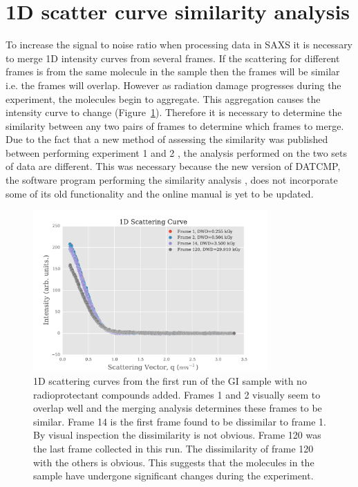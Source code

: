 \section{1D scatter curve similarity analysis}
\label{sec:1D scatter curve similarity analysis}
To increase the signal to noise ratio when processing data in SAXS it is necessary to merge 1D intensity curves from several frames.
If the scattering for different frames is from the same molecule in the sample then the frames will be similar i.e. the frames will overlap.
However as radiation damage progresses during the experiment, the molecules begin to aggregate.
This aggregation causes the intensity curve to change (Figure~\ref{fig:1D Scatter Curves}).
Therefore it is necessary to determine the similarity between any two pairs of frames to determine which frames to merge.
Due to the fact that a new method of assessing the similarity was published between performing experiment 1 and 2 \cite{franke2015correlation}, the analysis performed on the two sets of data are different.
This was necessary because the new version of DATCMP, the software program performing the similarity analysis \cite{petoukhov2012new}, does not incorporate some of its old functionality and the online manual is yet to be updated.
\begin{figure}
    \centering
    \includegraphics[width=0.8\textwidth]{figures/saxs/scatter_curves.pdf}
    \caption{1D scattering curves from the first run of the GI sample with no radioprotectant compounds added. Frames 1 and 2 visually seem to overlap well and the merging analysis determines these frames to be similar. Frame 14 is the first frame found to be dissimilar to frame 1. By visual inspection the dissimilarity is not obvious. Frame 120 was the last frame collected in this run. The dissimilarity of frame 120 with the others is obvious. This suggests that the molecules in the sample have undergone significant changes during the experiment.}
    \label{fig:1D Scatter Curves}
\end{figure}

